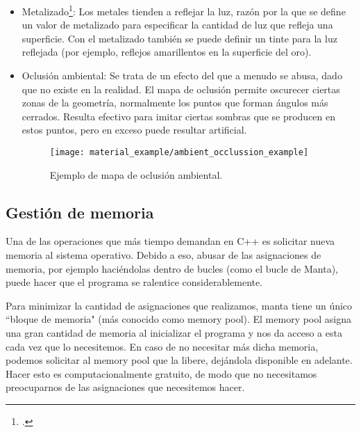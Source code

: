 \begin{itemize}
    \item Metalizado\footcite{marmoset_basicpbr}: Los metales tienden a reflejar la luz, razón por la que se define un valor de metalizado para especificar la cantidad de luz que refleja una superficie. Con el metalizado también se puede definir un tinte para la luz reflejada (por ejemplo, reflejos amarillentos en la superficie del oro).
    \item Oclusión ambiental: Se trata de un efecto del que a menudo se abusa, dado que no existe en la realidad. El mapa de oclusión permite oscurecer ciertas zonas de la geometría, normalmente los puntos que forman ángulos más cerrados. Resulta efectivo para imitar ciertas sombras que se producen en estos puntos, pero en exceso puede resultar artificial.
    \begin{figure}[H]
        \centering
        \texttt{[image: material\_example/ambient\_occlussion\_example]}
        \caption{Ejemplo de mapa de oclusión ambiental.}
        \label{fig:occlusion_ex}
    \end{figure}
\end{itemize}

\subsection{Gestión de memoria}
\label{engine_memory}
Una de las operaciones que más tiempo demandan en C++ es solicitar nueva memoria al sistema operativo. Debido a eso, abusar de las asignaciones de memoria, por ejemplo haciéndolas dentro de bucles (como el bucle de Manta), puede hacer que el programa se ralentice considerablemente.

Para minimizar la cantidad de asignaciones que realizamos, manta tiene un único ``bloque de memoria" (más conocido como memory pool). El memory pool asigna una gran cantidad de memoria al inicializar el programa y nos da acceso a esta cada vez que lo necesitemos. En caso de no necesitar más dicha memoria, podemos solicitar al memory pool que la libere, dejándola disponible en adelante. Hacer esto es computacionalmente gratuito, de modo que no necesitamos preocuparnos de las asignaciones que necesitemos hacer.

